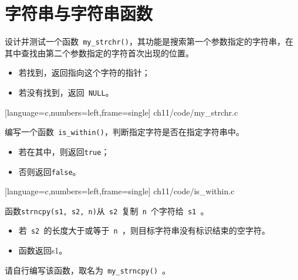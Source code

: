 \section{字符串与字符串函数}
\begin{frame}[fragile]
\begin{li} 
设计并测试一个函数\lstinline| my_strchr()|，其功能是搜索第一个参数指定的字符串，在其中查找由第二个参数指定的字符首次出现的位置。
\begin{itemize}
\item 若找到，返回指向这个字符的指针；
\item 若没有找到，返回\lstinline| NULL|。
\end{itemize}
\end{li}
\end{frame}


\begin{frame}

[language=c,numbers=left,frame=single]
{ch11/code/my_strchr.c}
\end{frame}


\begin{frame}[fragile]
\begin{li} 
编写一个函数\lstinline| is_within()|，判断指定字符是否在指定字符串中。
\begin{itemize}
\item 若在其中，则返回\lstinline|true|；
\item 否则返回\lstinline|false|。
\end{itemize}
\end{li}
\end{frame}


\begin{frame}

[language=c,numbers=left,frame=single]
{ch11/code/is_within.c}
\end{frame}

\begin{frame}[fragile]
\begin{li} 
函数\lstinline|strncpy(s1, s2, n)|从\lstinline| s2 |复制\lstinline| n |个字符给\lstinline| s1 |。
\begin{itemize}
\item 若\lstinline| s2 |的长度大于或等于\lstinline| n |，则目标字符串没有标识结束的空字符。
\item 函数返回{\tf s1}。
\end{itemize}
请自行编写该函数，取名为\lstinline| my_strncpy() |。
\end{li}
\end{frame}


